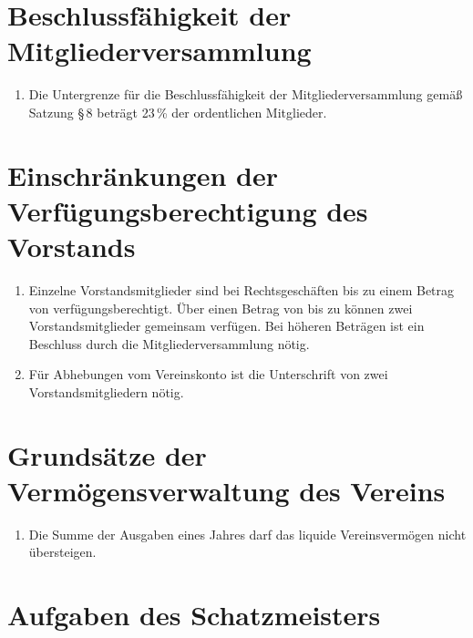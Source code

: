 \documentclass[fontsize=12pt,paper=a4,pagesize,headings=small]{scrartcl}
\begin{document}
\section{Beschlussfähigkeit der Mitgliederversammlung}

\begin{enumerate}
    \item Die Untergrenze für die Beschlussfähigkeit der Mitgliederversammlung
        gemäß Satzung §\,8 beträgt 23\,\% der ordentlichen Mitglieder.
\end{enumerate}

\section{Einschränkungen der Verfügungsberechtigung des Vorstands}

\begin{enumerate}
    \item Einzelne Vorstandsmitglieder sind bei Rechtsgeschäften bis zu
        einem Betrag von  verfügungsberechtigt. Über einen Betrag
        von bis zu  können zwei Vorstandsmitglieder gemeinsam
        verfügen. Bei höheren Beträgen ist ein Beschluss durch die
        Mitgliederversammlung nötig.

    \item Für Abhebungen vom Vereinskonto ist die Unterschrift von zwei
        Vorstandsmitgliedern nötig.

\end{enumerate}

\section{Grundsätze der Vermögensverwaltung des Vereins}

\begin{enumerate}
    \item Die Summe der Ausgaben eines Jahres darf das liquide
            Vereinsvermögen nicht übersteigen.
\end{enumerate}

\section{Aufgaben des Schatzmeisters}
\end{document}

